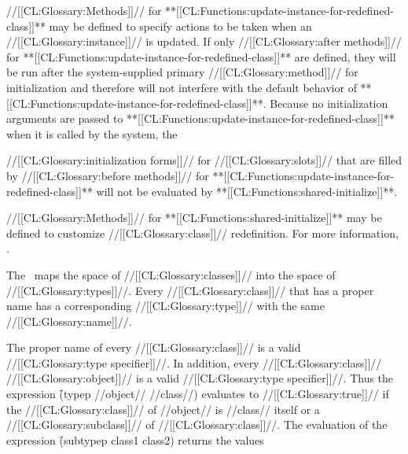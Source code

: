 \endsubsubsection%

             

//[[CL:Glossary:Methods]]// for **[[CL:Functions:update-instance-for-redefined-class]]** may be 
defined to specify actions to be taken when an //[[CL:Glossary:instance]]// is updated.
If only //[[CL:Glossary:after methods]]// for **[[CL:Functions:update-instance-for-redefined-class]]** are
defined, they will be run after the system-supplied primary //[[CL:Glossary:method]]// for
initialization and therefore will not interfere with the default
behavior of **[[CL:Functions:update-instance-for-redefined-class]]**.  Because no
initialization arguments are passed to **[[CL:Functions:update-instance-for-redefined-class]]**
when it is called by the system, the 

//[[CL:Glossary:initialization forms]]// for //[[CL:Glossary:slots]]// 
that are filled by //[[CL:Glossary:before methods]]// for **[[CL:Functions:update-instance-for-redefined-class]]** 
will not be evaluated by **[[CL:Functions:shared-initialize]]**.

//[[CL:Glossary:Methods]]// for **[[CL:Functions:shared-initialize]]** may be defined to customize
//[[CL:Glossary:class]]// redefinition.  For more information, \seesection\SharedInitialize.

\endsubsubsection%

























                                              
The \CLOS\ maps the space of //[[CL:Glossary:classes]]// into the space of //[[CL:Glossary:types]]//.
Every //[[CL:Glossary:class]]// that has a proper name has a corresponding //[[CL:Glossary:type]]// 
with the same //[[CL:Glossary:name]]//.  

The proper name of every //[[CL:Glossary:class]]// is a valid //[[CL:Glossary:type specifier]]//.  In
addition, every //[[CL:Glossary:class]]// //[[CL:Glossary:object]]// is a valid //[[CL:Glossary:type specifier]]//.  
Thus the expression \f{(typep //object// //class//)} evaluates to 
//[[CL:Glossary:true]]// if the //[[CL:Glossary:class]]// of //object// is //class// itself or 
a //[[CL:Glossary:subclass]]// of //[[CL:Glossary:class]]//.  The evaluation of the expression
\f{(subtypep class1 class2)} returns the values 


